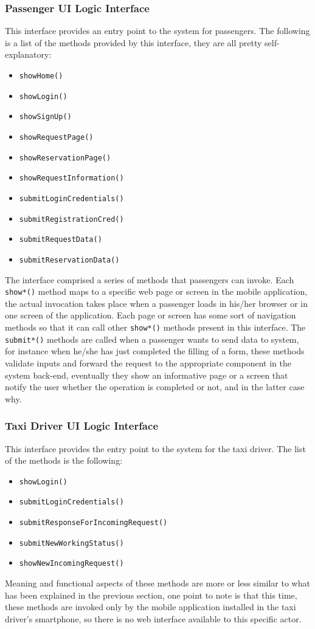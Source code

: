 \subsubsection{Passenger UI Logic Interface}
This interface provides an entry point to the system for passengers. \newline
The following is a list of the methods provided by this interface, they are all pretty self-explanatory:
\begin{itemize}
	\item \texttt{showHome()}
	\item \texttt{showLogin()}
	\item \texttt{showSignUp()}
	\item \texttt{showRequestPage()}
	\item \texttt{showReservationPage()}
	\item \texttt{showRequestInformation()}
	\item \texttt{submitLoginCredentials()}
	\item \texttt{submitRegistrationCred()}
	\item \texttt{submitRequestData()}
	\item \texttt{submitReservationData()}
\end{itemize}
The interface comprised a series of methods that passengers can invoke. Each \texttt{show*()} method maps to a specific web page or screen in the mobile application, the actual invocation takes place when a passenger loads in his/her browser or in one screen of the application. Each page or screen has some sort of navigation methods so that it can call other \texttt{show*()} methods present in this interface. \newline
The \texttt{submit*()} methods are called when a passenger wants to send data to system, for instance when he/she has just completed the filling of a form, these methods validate inputs and forward the request to the appropriate component in the system back-end, eventually they show an informative page or a screen that notify the user whether the operation is completed or not, and in the latter case why. 
\subsubsection{Taxi Driver UI Logic Interface}
This interface provides the entry point to the system for the taxi driver.
The list of the methods is the following:
\begin{itemize}
	\item \texttt{showLogin()}
	\item \texttt{submitLoginCredentials()}
	\item \texttt{submitResponseForIncomingRequest()}
	\item \texttt{submitNewWorkingStatus()}
	\item \texttt{showNewIncomingRequest()}
\end{itemize}
Meaning and functional aspects of these methods are more or less similar to what has been explained in the previous section, one point to note is that this time, these methods are invoked only by the mobile application installed in the taxi driver's smartphone, so there is no web interface available to this specific actor.
